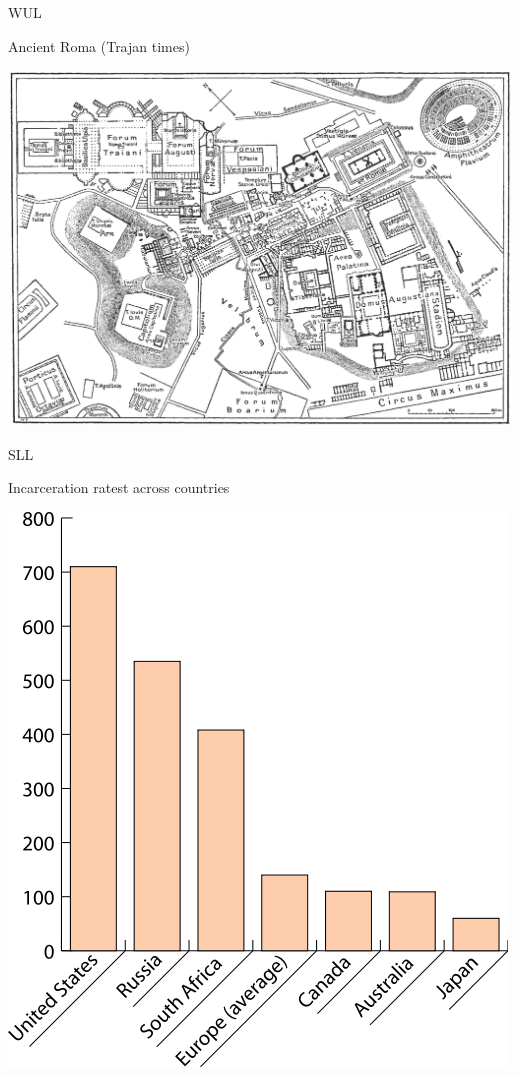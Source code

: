 \documentclass[print,Draft]{faosyb}
\begin{document}
\begin{map}{W}{UL}
\caption{Ancient Roma  (Trajan times)}
\label{map:roma}
\includegraphics[width=\chartwidth,height=\chartheight]{Rome}
\end{map}

\begin{chart}{S}{LL}
\caption{Incarceration ratest across countries}
\label{chart:incarceration}
\includegraphics[width=\chartwidth,height=\chartheight]{incarceration}  
\end{chart}
\end{document}
